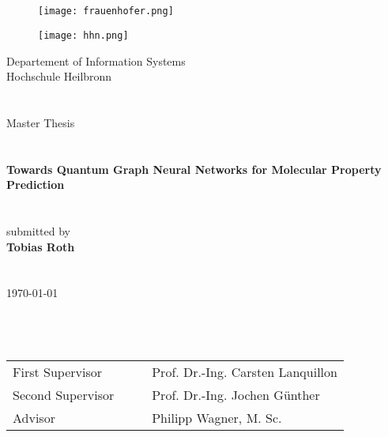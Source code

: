\thispagestyle{empty}
~\\~\\
\begin{center}
    \begin{figure}
        \centering
        \begin{minipage}{.5\textwidth}
            \centering
            \texttt{[image: frauenhofer.png]}
        \end{minipage}%
        \begin{minipage}{.5\textwidth}
            \centering
            \texttt{[image: hhn.png]}
        \end{minipage}
    \end{figure}
    {\LARGE{Departement of Information Systems}\\\vspace*{0.3cm} Hochschule Heilbronn}
    ~\\ ~\\~\\

    {\large Master Thesis}\\
    ~\\~\\
  
    {\LARGE\textbf{Towards Quantum Graph Neural Networks for Molecular Property Prediction}}
    ~\\  ~\\ ~\\
    \small{submitted by}\\\vspace*{3mm}
    {\large\textbf{Tobias Roth}}\\
    ~\\ ~\\
    \today
    ~\\  ~\\ ~\\~\\
    \begin{tabular}{l c c l}
        First Supervisor            & & & Prof. Dr.-Ing. Carsten Lanquillon          \\
        Second Supervisor         & & & Prof. Dr.-Ing. Jochen Günther        \\
        Advisor & & & Philipp Wagner, M. Sc.   \\
    \end{tabular}
\end{center}
